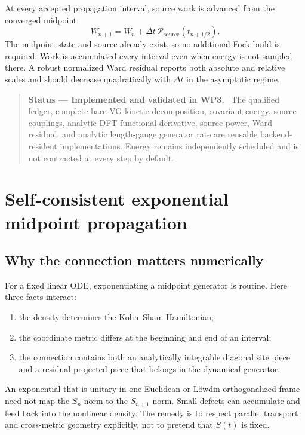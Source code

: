 \documentclass[11pt]{article}
\newenvironment{statusbox}[1]
  {\begin{quote}\small\textbf{Status --- #1.}\ }
  {\end{quote}}
\begin{document}
At every accepted propagation interval, source work is advanced from the
converged midpoint:
\begin{equation}
 W_{n+1}=W_n+\Delta t\,
 \mathcal P_{\mathrm{source}}(t_{n+1/2}) .
 \label{eq:work-quadrature}
\end{equation}
The midpoint state and source already exist, so no additional Fock build is
required. Work is accumulated every interval even when energy is not sampled
there. A robust normalized Ward residual reports both absolute and relative
scales and should decrease quadratically with \(\Delta t\) in the asymptotic
regime.

\begin{statusbox}{Implemented and validated in WP3}
The qualified ledger, complete bare-VG kinetic decomposition, covariant energy,
source couplings, analytic DFT functional derivative, source power, Ward
residual, and analytic length-gauge generator rate are reusable backend-
resident implementations. Energy remains independently scheduled and is not
contracted at every step by default.
\end{statusbox}

\section{Self-consistent exponential midpoint propagation}

\subsection{Why the connection matters numerically}

For a fixed linear ODE, exponentiating a midpoint generator is routine. Here
three facts interact:

\begin{enumerate}
\item the density determines the Kohn--Sham Hamiltonian;
\item the coordinate metric differs at the beginning and end of an interval;
\item the connection contains both an analytically integrable diagonal site
  piece and a residual projected piece that belongs in the dynamical
  generator.
\end{enumerate}

An exponential that is unitary in one Euclidean or L\"owdin-orthogonalized
frame need not map the \(S_n\) norm to the \(S_{n+1}\) norm. Small defects can
accumulate and feed back into the nonlinear density. The remedy is to respect
parallel transport and cross-metric geometry explicitly, not to pretend that
\(S(t)\) is fixed.
\end{document}
